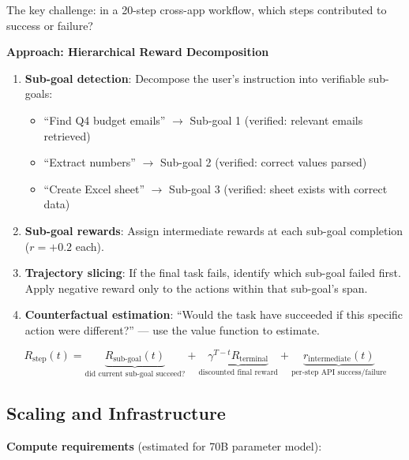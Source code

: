 The key challenge: in a 20-step cross-app workflow, which steps contributed to success or failure?

\textbf{Approach: Hierarchical Reward Decomposition}

\begin{enumerate}
  \item \textbf{Sub-goal detection}: Decompose the user’s instruction into verifiable sub-goals:

\begin{itemize}
  \item ``Find Q4 budget emails'' $\rightarrow$ Sub-goal 1 (verified: relevant emails retrieved)
  \item ``Extract numbers'' $\rightarrow$ Sub-goal 2 (verified: correct values parsed)
  \item ``Create Excel sheet'' $\rightarrow$ Sub-goal 3 (verified: sheet exists with correct data)
\end{itemize}
  \item \textbf{Sub-goal rewards}: Assign intermediate rewards at each sub-goal completion ($r = +0.2$ each).
  \item \textbf{Trajectory slicing}: If the final task fails, identify which sub-goal failed first. Apply negative reward only to the actions within that sub-goal’s span.
  \item \textbf{Counterfactual estimation}: ``Would the task have succeeded if this specific action were different?'' --- use the value function to estimate.
\end{enumerate}

\begin{equation}
R_{\text{step}}(t) = \underbrace{R_{\text{sub-goal}}(t)}_{\text{did current sub-goal succeed?}} + \underbrace{\gamma^{T-t} R_{\text{terminal}}}_{\text{discounted final reward}} + \underbrace{r_{\text{intermediate}}(t)}_{\text{per-step API success/failure}}
\end{equation}

\subsection{Scaling and Infrastructure}
\label{scaling-and-infrastructure}

\textbf{Compute requirements} (estimated for 70B parameter model):

